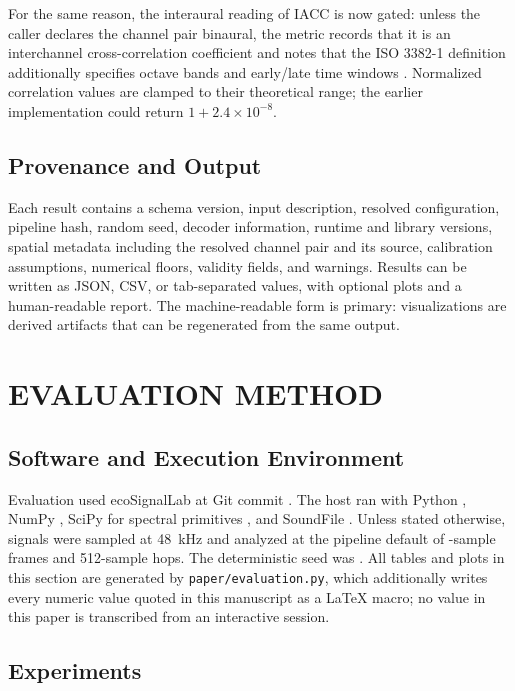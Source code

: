 \documentclass[final]{jaes}
\begin{document}
For the same reason, the interaural reading of IACC is now gated: unless the caller declares the channel pair binaural, the metric records that it is an interchannel cross-correlation coefficient and notes that the ISO 3382-1 definition additionally specifies octave bands and early/late time windows \cite{iso3382}. Normalized correlation values are clamped to their theoretical range; the earlier implementation could return $1+2.4\times10^{-8}$.

\subsection{Provenance and Output}
\label{sec:provenance}

Each result contains a schema version, input description, resolved configuration, pipeline hash, random seed, decoder information, runtime and library versions, spatial metadata including the resolved channel pair and its source, calibration assumptions, numerical floors, validity fields, and warnings. Results can be written as JSON, CSV, or tab-separated values, with optional plots and a human-readable report. The machine-readable form is primary: visualizations are derived artifacts that can be regenerated from the same output.

\section{EVALUATION METHOD}

\subsection{Software and Execution Environment}

Evaluation used ecoSignalLab at Git commit \texttt{\eslCommit}. The host ran \eslPlatform{} with Python \eslPython{}, NumPy \eslNumpy{}, SciPy for spectral primitives \cite{virtanen2020}, and SoundFile \eslSoundfile{}. Unless stated otherwise, signals were sampled at 48~kHz and analyzed at the pipeline default of \anaFrame-sample frames and 512-sample hops. The deterministic seed was \eslSeed{}. All tables and plots in this section are generated by \texttt{paper/evaluation.py}, which additionally writes every numeric value quoted in this manuscript as a \LaTeX{} macro; no value in this paper is transcribed from an interactive session.

\subsection{Experiments}
\end{document}
